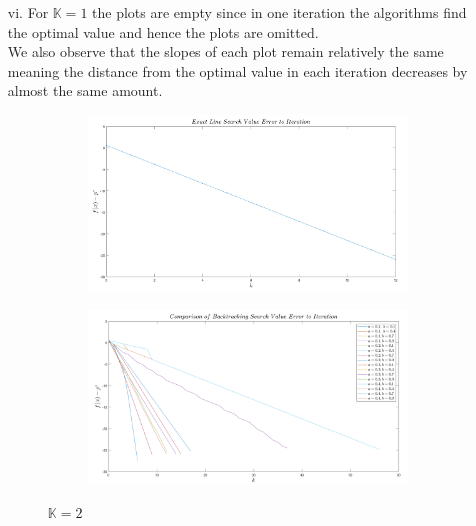 \documentclass[12pt]{article}
\begin{document}
\begin{enumerate}
\begin{enumerate}
			\item[vi.]
			For $\mathbb{K}=1$ the plots are empty since in one iteration the algorithms find the optimal value and hence the plots are omitted.\\
			We also observe that the slopes of each plot remain relatively the same meaning the distance from the optimal value in each iteration decreases by almost the same amount. 
			\begin{figure}
				\centering
				\begin{subfigure}[b]{0.45\textwidth}
					\centering
					\includegraphics[width=\textwidth]{2_4.png}
				\end{subfigure}
				\hfill
				\begin{subfigure}[b]{0.45\textwidth}
					\centering
					\includegraphics[width=\textwidth]{2_1.png}
				\end{subfigure}
				\caption{$\mathbb{K}=2$}
			\end{figure}
			\begin{figure}
				\centering
				\begin{subfigure}[b]{0.45\textwidth}
					\centering

\end{subfigure}
\end{figure}
\end{enumerate}
\end{enumerate}
\end{document}

